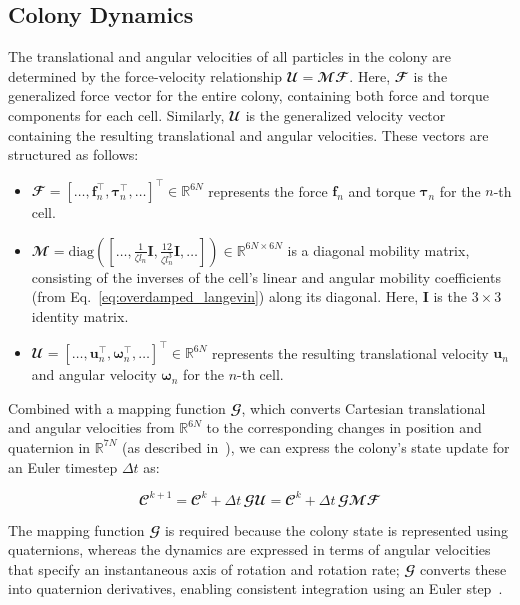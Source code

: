 \documentclass[conference]{IEEEtran}
\begin{document}
\subsection{Colony Dynamics}

The translational and angular velocities of all particles in the colony are determined by the force-velocity relationship $\mathbfcal{U} = \mathbfcal{M} \mathbfcal{F}$. Here, $\mathbfcal{F}$ is the generalized force vector for the entire colony, containing both force and torque components for each cell. Similarly, $\mathbfcal{U}$ is the generalized velocity vector containing the resulting translational and angular velocities. These vectors are structured as follows:

\begin{itemize}
    \item
          $\mathbfcal{F} = [\dots, \mathbf{f}_n^\top, \boldsymbol{\tau}_n^\top, \dots]^\top \in \mathbb{R}^{6N}$ represents the force $\mathbf{f}_n$ and torque $\boldsymbol{\tau}_n$ for the $n$-th cell.
    \item
          $\mathbfcal{M} = \text{diag}([\dots, \frac{1}{\zeta l_n}\mathbf{I}, \frac{12}{\zeta l_n^3}\mathbf{I}, \dots]) \in \mathbb{R}^{6N \times 6N}$ is a diagonal mobility matrix, consisting of the inverses of the cell's linear and angular mobility coefficients (from Eq.~\ref{eq:overdamped_langevin}) along its diagonal. Here, $\mathbf{I}$ is the $3 \times 3$ identity matrix.
    \item
          $\mathbfcal{U} = [\dots, \mathbf{u}_n^\top, \boldsymbol{\omega}_n^\top, \dots]^\top \in \mathbb{R}^{6N}$ represents the resulting translational velocity $\mathbf{u}_n$ and angular velocity $\boldsymbol{\omega}_n$ for the $n$-th cell.
\end{itemize}


Combined with a mapping function $\mathbfcal{G}$, which converts Cartesian translational and angular velocities from $\mathbb{R}^{6N}$ to the corresponding changes in position and quaternion in $\mathbb{R}^{7N}$ (as described in~\cite{Weady2024SM,Yan2022,Tasora2008}), we can express the colony's state update for an Euler timestep $\Delta t$ as:

\begin{equation} \label{eq:colony_update}
    \mathbfcal{C}^{k+1} = \mathbfcal{C}^k + \Delta t \, \mathbfcal{G} \mathbfcal{U} = \mathbfcal{C}^k + \Delta t \, \mathbfcal{G} \mathbfcal{M} \mathbfcal{F}
\end{equation}

The mapping function $\mathbfcal{G}$ is required because the colony state is represented using quaternions, whereas the dynamics are expressed in terms of angular velocities that specify an instantaneous axis of rotation and rotation rate; $\mathbfcal{G}$ converts these into quaternion derivatives, enabling consistent integration using an Euler step~\cite{Weady2024SM, Tasora2008}.
\end{document}
